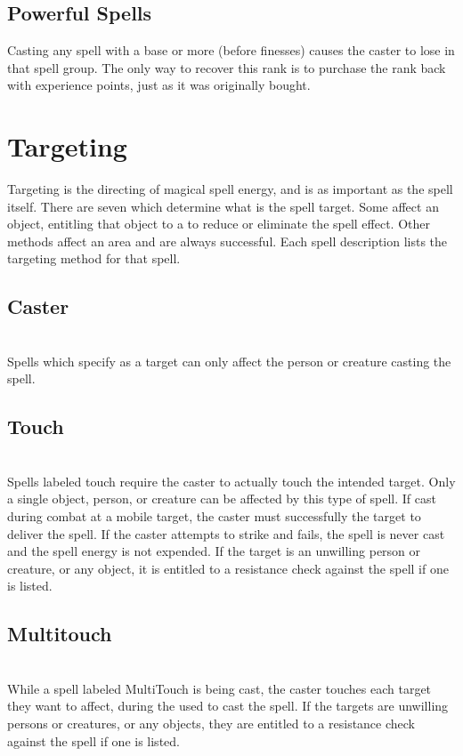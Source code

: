 \begin{multicols}{2}
\subsection{Powerful Spells}
Casting any spell with a base  or more (before finesses) causes the caster to  lose  in that spell group. The only way to recover this rank is to purchase the rank back with experience points, just as it was originally bought.
\section{Targeting}
Targeting is the directing of magical spell energy, and is as important as the spell itself. There are seven  which determine what is the spell target. Some affect an object, entitling that object to a  to reduce or eliminate the spell effect. Other methods affect an area and are always successful. Each spell description lists the targeting method for that spell.
\subsection{Caster}
\\
Spells which specify  as a target can only
affect the person or creature casting the spell.
\subsection{Touch}
\\
Spells labeled touch require the caster to actually touch the intended target. Only a single object, person, or creature can be affected by this type of spell. If cast during combat at a mobile target, the caster must successfully  the target to deliver the spell. If the caster attempts to strike and fails, the spell is never cast and the spell energy is not expended. If the target is an unwilling person or creature,
or any object, it is entitled to a resistance check against the spell if one is listed.
\subsection{Multitouch}
\\
While a spell labeled MultiTouch is being cast, the caster touches each target they want to affect, during the  used to cast the spell.  If the targets are unwilling persons or creatures, or any objects, they are entitled to a resistance check against the spell if one is listed.

\end{multicols}
